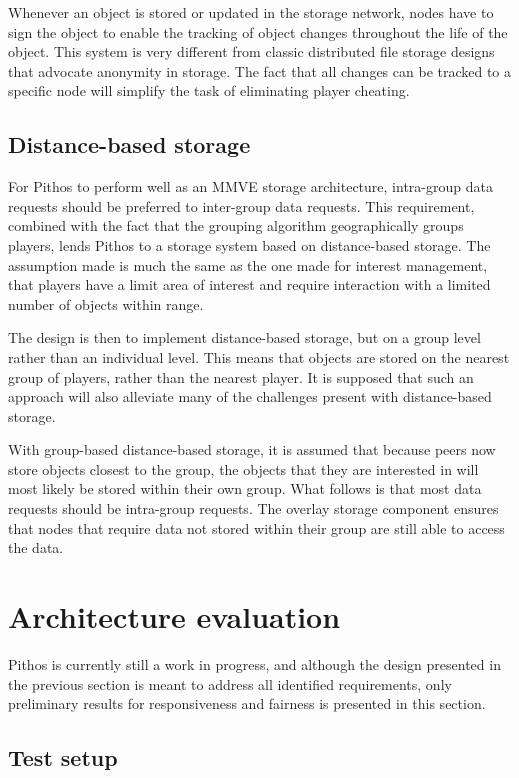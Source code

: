 \documentclass[10pt,a4paper,conference]{IEEEtran}
\begin{document}
Whenever an object is stored or updated in the storage network, nodes have to sign the object to enable the tracking of object changes throughout the
life of the object. This system is very different from classic distributed file storage designs that advocate anonymity in storage. The fact that all
changes can be tracked to a specific node will simplify the task of eliminating player cheating.

\subsection{Distance-based storage} \label{distance_based}

For Pithos to perform well as an MMVE storage architecture, intra-group data requests should be preferred to inter-group data requests. This
requirement, combined with the fact that the grouping algorithm geographically groups players, lends Pithos to a storage system based on
distance-based storage. The assumption made is much the same as the one made for interest management, that players have a limit area of interest and
require interaction with a limited number of objects within range.

The design is then to implement distance-based storage, but on a group level rather than an individual level. This means that objects are stored on
the nearest group of players, rather than the nearest player. It is supposed that such an approach will also alleviate many of the challenges present
with distance-based storage.

With group-based distance-based storage, it is assumed that because peers now store objects closest to the group, the objects that they are
interested in will most likely be stored within their own group. What follows is that most data requests should be intra-group requests. The overlay
storage component ensures that nodes that require data not stored within their group are still able to access the data.

\section{Architecture evaluation}
\label{evaluation}

Pithos is currently still a work in progress, and although the design presented in the previous section is meant to address all identified
requirements, only preliminary results for responsiveness and fairness is presented in this section.

\subsection{Test setup}
\label{test_setup}
\end{document}

